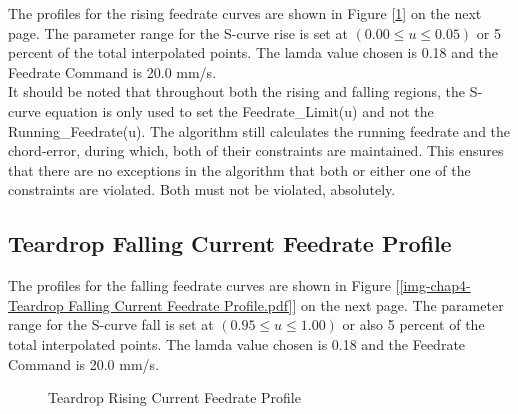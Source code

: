The profiles for the rising feedrate curves are shown in Figure [\ref{img-chap4-Teardrop Rising Current Feedrate Profile.pdf}] on the next page. The parameter range for the S-curve rise is set at $(0.00 \le u \le 0.05)$ or 5 percent of the total interpolated points. The lamda value chosen is 0.18 and the Feedrate Command is 20.0 mm/s.\\

It should be noted that throughout both the rising and falling regions, the S-curve equation is only used to set the Feedrate\_Limit(u) and not the Running\_Feedrate(u). The algorithm still calculates the running feedrate and the chord-error, during which, both of their constraints are maintained. This ensures that there are no exceptions in the algorithm that both or either one of the constraints are violated. Both must not be violated, absolutely. 


\subsection{Teardrop Falling Current Feedrate Profile}
\label{ssec-chap4-Teardrop Falling Current Feedrate Profile}

The profiles for the falling feedrate curves are shown in Figure [\ref{img-chap4-Teardrop Falling Current Feedrate Profile.pdf}] on the next page. The parameter range for the S-curve fall is set at $(0.95 \le u \le 1.00)$ or also 5 percent of the total interpolated points. The lamda value chosen is 0.18 and the Feedrate Command is 20.0 mm/s.\\



\clearpage
\pagebreak

\begin{figure}
	\caption  {Teardrop Rising Current Feedrate Profile}
	\label{img-chap4-Teardrop Rising Current Feedrate Profile.pdf}
\end{figure}	

